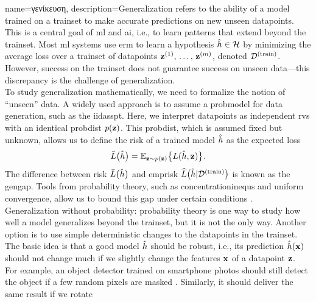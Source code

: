 {name={\foreignlanguage{greek}{γενίκευση}}, 
	description={Generalization 
		refers to the ability of a \gls{model} trained on a \gls{trainset} to make accurate 
		\gls{prediction}s on new unseen \gls{datapoint}s. This is a central goal of \gls{ml} and \gls{ai}, i.e.,
		to learn patterns that extend beyond the \gls{trainset}. Most \gls{ml} systems 
		use \gls{erm} to learn a \gls{hypothesis} $\hat{h} \in \mathcal{H}$ by minimizing 
		the average \gls{loss} over a \gls{trainset} of \gls{datapoint}s ${\bf z}^{(1)}, \,\ldots, \,{\bf z}^{(m)}$, 
		denoted $\mathcal{D}^{(\rm train)}$. However, success on the \gls{trainset} does not guarantee success on 
		unseen \gls{data}—this discrepancy is the challenge of generalization. \\ To study generalization 
		mathematically, we need to formalize the notion of ``unseen'' \gls{data}. A widely used 
		approach is to assume a \gls{probmodel} for \gls{data} generation, such as the \gls{iidasspt}. 
		Here, we interpret \gls{datapoint}s as independent \gls{rv}s with an identical 
		\gls{probdist} $p({\bf z})$. This \gls{probdist}, which is assumed fixed but unknown, 
		allows us to define the \gls{risk} of a trained \gls{model} $\hat{h}$ as the expected \gls{loss}
		\[
		\bar{L} \big( \hat{h} \big)=\mathbb{E}_{{\bf z} \sim p({\bf z})} \big\{ L(\hat{h}, {\bf z}) \big\}.
		\]
		The difference between \gls{risk} $\bar{L} \big( \hat{h} \big)$ and \gls{emprisk} $\widehat{L}\big(\hat{h}|\mathcal{D}^{(\rm train)}\big)$ 
		is known as the \gls{gengap}. Tools from \gls{probability} theory, such as \gls{concentrationinequ}s 
		and uniform \gls{convergence}, allow us to bound this gap under certain conditions \cite{ShalevMLBook}.\\
		Generalization without \gls{probability}: \Gls{probability} theory is one way to study how well a 
		\gls{model} generalizes beyond the \gls{trainset}, but it is not the only way. Another option is to use 
		simple deterministic changes to the \gls{datapoint}s in the \gls{trainset}. The basic idea is that a 
		good \gls{model} $\hat{h}$ should be robust, i.e., its \gls{prediction} $\hat{h}({\bf x})$ 
		should not change much if we slightly change the \gls{feature}s ${\bf x}$ of a \gls{datapoint} ${\bf z}$. 
		\\[1mm] For example, an object detector trained on smartphone photos should still detect the object if a few 
		random pixels are masked \cite{OnePixelAttack}. Similarly, it should deliver the same result if we rotate 
}}
